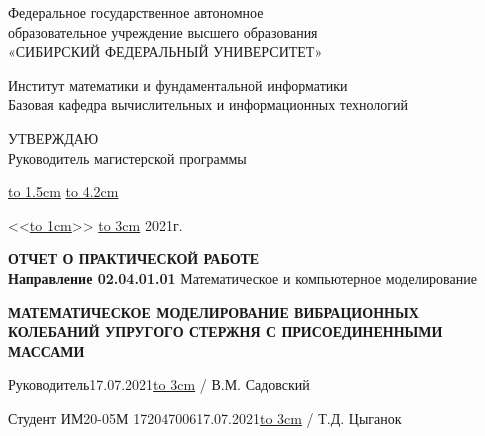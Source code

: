 \documentclass[a4paper,14pt,russian]{extreport}
\numberwithin{figure}{section}
\begin{document}
\pagestyle{empty}


\begin{center}

Федеральное государственное автономное\\
образовательное учреждение высшего образования\\
«СИБИРСКИЙ ФЕДЕРАЛЬНЫЙ УНИВЕРСИТЕТ»\\

\bigskip

Институт математики и фундаментальной информатики\\
\normalsize{Базовая кафедра вычислительных и информационных технологий}\\

\vspace{2cm}
\end{center}

\hfill
\begin{minipage}{0.4\textwidth}
\begin{flushleft}
{  УТВЕРЖДАЮ}\\
 Руководитель магистерской программы

\vspace{0.2cm}

\underline{\hbox to 1.5cm{\hfil}} \underline{\hbox to 4.2cm{\hfil}}
\noindent
\vspace{0.2cm}

<<\underline{\hbox to 1cm{\hfil}}>>  \underline{\hbox to 3cm{\hfil}} 2021г.
\end{flushleft}

\end{minipage}

\vspace{2cm}

\begin{center}
{\large\textbf{ОТЧЕТ О ПРАКТИЧЕСКОЙ РАБОТЕ}}
\vspace{0.5cm}
\\
{\large  \textbf{Направление 02.04.01.01} Математическое и компьютерное моделирование}

\vspace{1cm}

{\large\bf МАТЕМАТИЧЕСКОЕ МОДЕЛИРОВАНИЕ ВИБРАЦИОННЫХ КОЛЕБАНИЙ УПРУГОГО СТЕРЖНЯ С ПРИСОЕДИНЕННЫМИ МАССАМИ}
\end{center}

 \vspace{1.5cm}

\begin{flushleft}
Руководитель\hfill 17.07.2021\;\;\;\underline{\hbox to 3cm{\hfil}} / В.М. Садовский\\
\end{flushleft}
\begin{flushleft}
Студент ИМ20-05М 172047006\hfill 17.07.2021\;\;\;\underline{\hbox to 3cm{\hfil}} / Т.Д. Цыганок\\
\end{flushleft}
\end{document}
